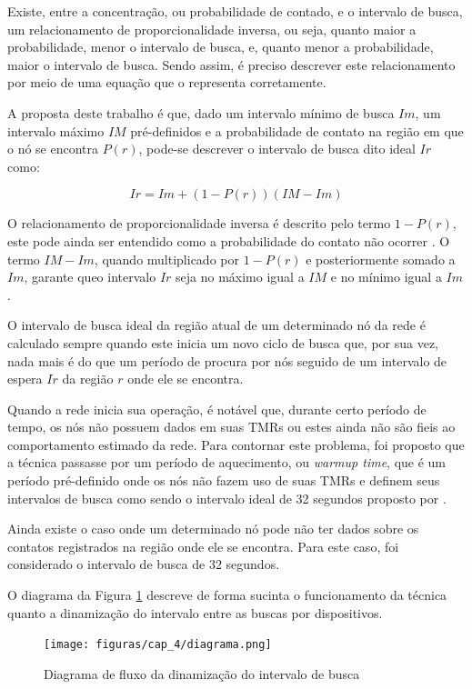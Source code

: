 Existe, entre a concentração, ou probabilidade de contado, e o intervalo de busca, um relacionamento de proporcionalidade inversa, ou seja, quanto maior a probabilidade, menor o intervalo de busca, e, quanto menor a probabilidade, maior o intervalo de busca. Sendo assim, é preciso descrever este relacionamento por meio de uma equação que o representa corretamente.

A proposta deste trabalho é que, dado um intervalo mínimo de busca $Im$, um intervalo máximo $IM$ pré-definidos e a probabilidade de contato na região em que o nó se encontra $P(r)$, pode-se descrever o intervalo de busca dito ideal $Ir$ como:

\begin{equation}
Ir=Im + (1-P(r))(IM-Im)
\label{eq_intervalo_ideal}
\end{equation}

O relacionamento de proporcionalidade inversa é descrito pelo termo $1-P(r)$, este pode ainda ser entendido como a probabilidade do contato não ocorrer \cite{hazzan2013fundamentos}. O termo $IM-Im$, quando multiplicado por $1-P(r)$ e posteriormente somado a $Im$, garante queo intervalo $Ir$ seja no máximo igual a $IM$  e no mínimo igual a $Im$.

O intervalo de busca ideal da região atual de um determinado nó da rede é calculado sempre quando este inicia um novo ciclo de busca que, por sua vez, nada mais é do que um período de procura por nós seguido de um intervalo de espera $Ir$ da região $r$ onde ele se encontra.

Quando a rede inicia sua operação, é notável que, durante certo período de tempo, os nós não possuem dados em suas TMRs ou estes ainda não são fieis ao comportamento estimado da rede. Para contornar este problema, foi proposto que a técnica passasse por um período de aquecimento, ou \emph{warmup time}, que é um período pré-definido onde os nós não fazem uso de suas TMRs e definem seus intervalos de busca como sendo o intervalo ideal de 32 segundos proposto por \cite{denis_artigo}.

Ainda existe o caso onde um determinado nó pode não ter dados sobre os contatos registrados na região onde ele se encontra. Para este caso, foi considerado o intervalo de busca de 32 segundos.

O diagrama da Figura \ref{diagrama} descreve de forma sucinta o funcionamento da técnica quanto a dinamização do intervalo entre as buscas por dispositivos.

\begin{figure}[htp!]
\centering
\texttt{[image: figuras/cap\_4/diagrama.png]}
\caption{Diagrama de fluxo da dinamização do intervalo de busca}
\label{diagrama}
\end{figure}